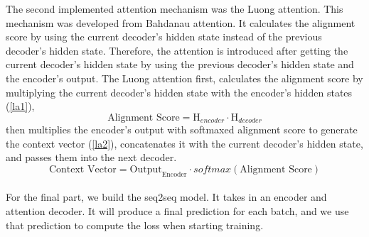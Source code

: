 \documentclass[conference]{IEEEtran}
\begin{document}
\indent The second implemented attention mechanism was the Luong attention. This mechanism was developed from Bahdanau attention. It calculates the alignment score by using the current decoder’s hidden state instead of the previous decoder’s hidden state. Therefore, the attention is introduced after getting the current decoder’s hidden state by using the previous decoder’s hidden state and the encoder’s output. The Luong attention first, calculates the alignment score by multiplying the current decoder’s hidden state with the encoder’s hidden states (\ref{la1}),
\begin{equation}
    \label{la1}
    \text{Alignment Score} = \mathrm{H}_{encoder}^{} \cdot \mathrm{H}_{decoder}^{}
\end{equation}  
then multiplies the encoder's output with softmaxed alignment score to generate the context vector (\ref{la2}), concatenates it with the current decoder’s hidden state, and passes them into the next decoder.
\begin{equation}
    \label{la2}
    \text{Context Vector} = \mathrm{Output}_{\text{Encoder}}^{} \cdot softmax(\text{Alignment Score})
\end{equation}  
\\
\indent For the final part, we build the seq2seq model. It takes in an encoder and attention decoder. It will produce a final prediction for each batch, and we use that prediction to compute the loss when starting training. 
\end{document}
